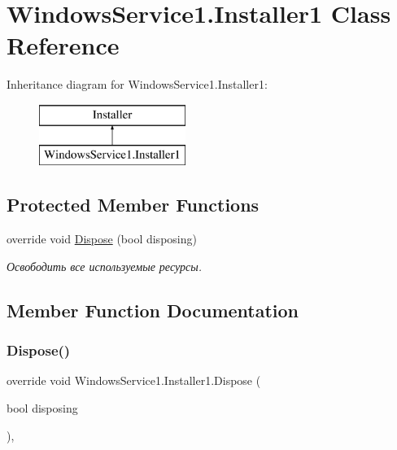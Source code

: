 \hypertarget{class_windows_service1_1_1_installer1}{}\section{Windows\+Service1.\+Installer1 Class Reference}
\label{class_windows_service1_1_1_installer1}
Inheritance diagram for Windows\+Service1.\+Installer1\+:\begin{figure}[H]
\begin{center}
\leavevmode
\includegraphics[height=2.000000cm]{class_windows_service1_1_1_installer1}
\end{center}
\end{figure}
\subsection*{Protected Member Functions}
\begin{DoxyCompactItemize}
\item 
override void \hyperlink{class_windows_service1_1_1_installer1_a77b7ef72d1485157054985463d92f70e}{Dispose} (bool disposing)
\begin{DoxyCompactList}\small\item\em Освободить все используемые ресурсы. \end{DoxyCompactList}\end{DoxyCompactItemize}


\subsection{Member Function Documentation}
\hypertarget{class_windows_service1_1_1_installer1_a77b7ef72d1485157054985463d92f70e}{}\label{class_windows_service1_1_1_installer1_a77b7ef72d1485157054985463d92f70e} 
\subsubsection{\texorpdfstring{Dispose()}{Dispose()}}
{\footnotesize\ttfamily override void Windows\+Service1.\+Installer1.\+Dispose (\begin{DoxyParamCaption}\item[{bool}]{disposing }\end{DoxyParamCaption})\hspace{0.3cm}{\ttfamily [inline]}, {\ttfamily [protected]}}



